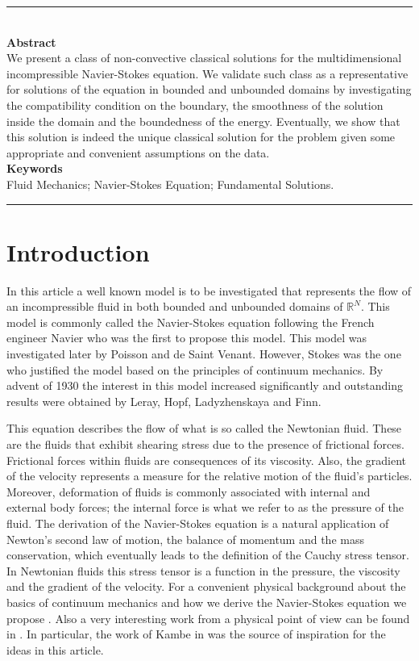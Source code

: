 \documentclass[a4 paper, 11pt,twoside]{article}
\newcommand{\0}{\Bf{0}}
\theoremstyle{definition}
\begin{document}
{\color{Brown}\rule{0.7\textwidth}{2pt}}\\[0.2cm]
{\color{Brown}\bf\large Abstract}\\
We present a class of non-convective classical solutions for the multidimensional incompressible Navier-Stokes equation. We validate such class as a representative for solutions of the equation in bounded and unbounded domains by investigating the compatibility condition on the boundary, the smoothness of the solution inside the domain and the boundedness of the energy. Eventually, we show that this solution is indeed the unique classical solution for the problem given some appropriate and convenient assumptions on the data.
\vspace{0.5cm}\\
{\color{Brown}\bf\large Keywords}\\
Fluid Mechanics; Navier-Stokes Equation; Fundamental Solutions.
\vspace{0cm}\\
{\color{Brown}\rule{0.7\textwidth}{2pt}}
\section{Introduction}

In this article a well known model is to be investigated that represents the flow of an incompressible fluid in both bounded and unbounded domains of $\mathbb{R}^N$. This model is commonly called the Navier-Stokes equation following the French engineer Navier who was the first to propose this model. This model was investigated later by Poisson and de Saint Venant. However, Stokes was the one who justified the model based on the principles of continuum mechanics. By advent of 1930 the interest in this model increased significantly and outstanding results were obtained by Leray, Hopf, Ladyzhenskaya and Finn.

This equation describes the flow of what is so called the Newtonian fluid. These are the fluids that exhibit shearing stress due to the presence of frictional forces. Frictional forces within fluids are consequences of its viscosity. Also, the gradient of the velocity represents a measure for the relative motion of the fluid's particles. Moreover, deformation of fluids is commonly associated with internal and external body forces; the internal force is what we refer to as the pressure of the fluid. The derivation of the Navier-Stokes equation is a natural application of Newton's second law of motion, the balance of momentum and the mass conservation, which eventually leads to the definition of the Cauchy stress tensor. In Newtonian fluids this stress tensor is a function in the pressure, the viscosity and the gradient of the velocity. For a convenient physical background about the basics of continuum mechanics and how we derive the Navier-Stokes equation we propose \cite{gurtin, kambeb}. Also a very interesting work from a physical point of view can be found in \cite{kambe1,kambe2}. In particular, the work of Kambe in \cite{kambe2} was the source of inspiration for the ideas in this article.
\end{document}
